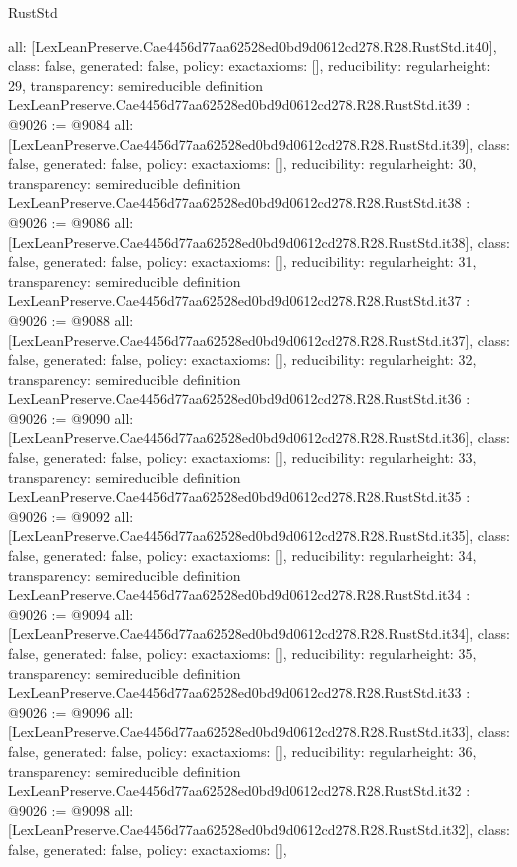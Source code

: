 \begin{lexlean}{RustStd}
\begin{coremodule}
{  all: [LexLeanPreserve.Cae4456d77aa62528ed0bd9d0612cd278.R28.RustStd.it40],
  class: false,
  generated: false,
  policy: exact{axioms: []},
  reducibility: regular{height: 29},
  transparency: semireducible
}
definition LexLeanPreserve.Cae4456d77aa62528ed0bd9d0612cd278.R28.RustStd.it39 : @9026 := @9084 {
  all: [LexLeanPreserve.Cae4456d77aa62528ed0bd9d0612cd278.R28.RustStd.it39],
  class: false,
  generated: false,
  policy: exact{axioms: []},
  reducibility: regular{height: 30},
  transparency: semireducible
}
definition LexLeanPreserve.Cae4456d77aa62528ed0bd9d0612cd278.R28.RustStd.it38 : @9026 := @9086 {
  all: [LexLeanPreserve.Cae4456d77aa62528ed0bd9d0612cd278.R28.RustStd.it38],
  class: false,
  generated: false,
  policy: exact{axioms: []},
  reducibility: regular{height: 31},
  transparency: semireducible
}
definition LexLeanPreserve.Cae4456d77aa62528ed0bd9d0612cd278.R28.RustStd.it37 : @9026 := @9088 {
  all: [LexLeanPreserve.Cae4456d77aa62528ed0bd9d0612cd278.R28.RustStd.it37],
  class: false,
  generated: false,
  policy: exact{axioms: []},
  reducibility: regular{height: 32},
  transparency: semireducible
}
definition LexLeanPreserve.Cae4456d77aa62528ed0bd9d0612cd278.R28.RustStd.it36 : @9026 := @9090 {
  all: [LexLeanPreserve.Cae4456d77aa62528ed0bd9d0612cd278.R28.RustStd.it36],
  class: false,
  generated: false,
  policy: exact{axioms: []},
  reducibility: regular{height: 33},
  transparency: semireducible
}
definition LexLeanPreserve.Cae4456d77aa62528ed0bd9d0612cd278.R28.RustStd.it35 : @9026 := @9092 {
  all: [LexLeanPreserve.Cae4456d77aa62528ed0bd9d0612cd278.R28.RustStd.it35],
  class: false,
  generated: false,
  policy: exact{axioms: []},
  reducibility: regular{height: 34},
  transparency: semireducible
}
definition LexLeanPreserve.Cae4456d77aa62528ed0bd9d0612cd278.R28.RustStd.it34 : @9026 := @9094 {
  all: [LexLeanPreserve.Cae4456d77aa62528ed0bd9d0612cd278.R28.RustStd.it34],
  class: false,
  generated: false,
  policy: exact{axioms: []},
  reducibility: regular{height: 35},
  transparency: semireducible
}
definition LexLeanPreserve.Cae4456d77aa62528ed0bd9d0612cd278.R28.RustStd.it33 : @9026 := @9096 {
  all: [LexLeanPreserve.Cae4456d77aa62528ed0bd9d0612cd278.R28.RustStd.it33],
  class: false,
  generated: false,
  policy: exact{axioms: []},
  reducibility: regular{height: 36},
  transparency: semireducible
}
definition LexLeanPreserve.Cae4456d77aa62528ed0bd9d0612cd278.R28.RustStd.it32 : @9026 := @9098 {
  all: [LexLeanPreserve.Cae4456d77aa62528ed0bd9d0612cd278.R28.RustStd.it32],
  class: false,
  generated: false,
  policy: exact{axioms: []},
}
\end{coremodule}
\end{lexlean}
